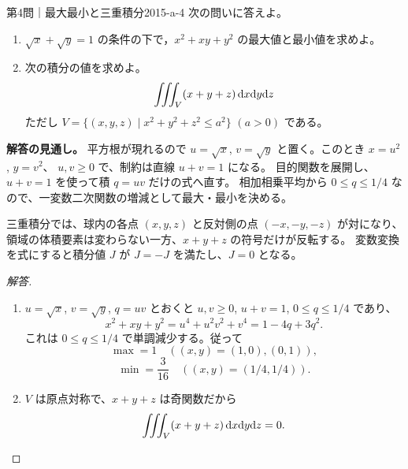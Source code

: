 \begin{problem}{第4問｜最大最小と三重積分}{2015-a-4}
次の問いに答えよ。
\begin{enumerate}
  \item[(1)] $\sqrt x+\sqrt y=1$ の条件の下で，$x^2+xy+y^2$ の最大値と最小値を求めよ。
  \item[(2)] 次の積分の値を求めよ。
  \[
  \iiint_V(x+y+z)\,\mathrm{d} x\mathrm{d} y\mathrm{d} z
  \]
  ただし $V=\{(x,y,z)\mid x^2+y^2+z^2\le a^2\}$ $(a>0)$ である。
\end{enumerate}
\end{problem}
\begin{memo*}
\textbf{解答の見通し。}
平方根が現れるので $u=\sqrt x$, $v=\sqrt y$ と置く。このとき $x=u^2$, $y=v^2$、
$u,v\ge0$ で、制約は直線 $u+v=1$ になる。
目的関数を展開し、$u+v=1$ を使って積 $q=uv$ だけの式へ直す。
相加相乗平均から $0\le q\le1/4$ なので、一変数二次関数の増減として最大・最小を決める。

三重積分では、球内の各点 $(x,y,z)$ と反対側の点 $(-x,-y,-z)$ が対になり、
領域の体積要素は変わらない一方、$x+y+z$ の符号だけが反転する。
変数変換を式にすると積分値 $J$ が $J=-J$ を満たし、$J=0$ となる。
\end{memo*}
\begin{proof}[解答]
\begin{enumerate}
  \item[(1)] $u=\sqrt x$, $v=\sqrt y$, $q=uv$ とおくと
  $u,v\ge0$, $u+v=1$, $0\le q\le1/4$ であり、
  \[
  x^2+xy+y^2=u^4+u^2v^2+v^4=1-4q+3q^2.
  \]
  これは $0\le q\le1/4$ で単調減少する。従って
  \[
  \max=1\quad ((x,y)=(1,0),(0,1)),
  \]
  \[
  \min=\frac3{16}\quad ((x,y)=(1/4,1/4)).
  \]

  \item[(2)] $V$ は原点対称で、$x+y+z$ は奇関数だから
  \[
  \iiint_V(x+y+z)\,\mathrm{d} x\mathrm{d} y\mathrm{d} z=0.
  \]
\end{enumerate}
\end{proof}
